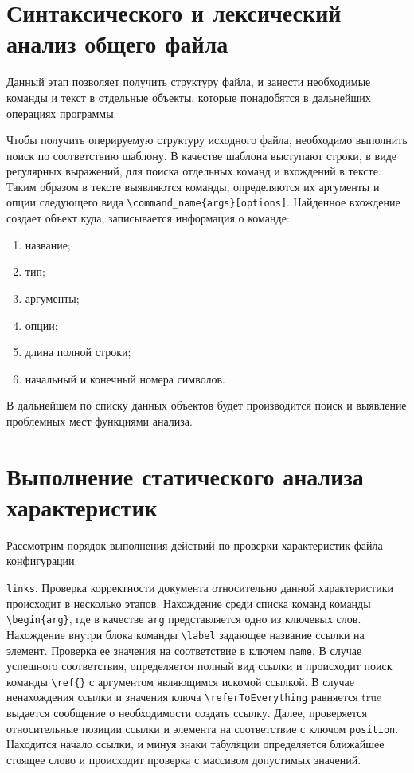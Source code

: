 \section{Синтаксического и лексический анализ общего файла}

Данный этап позволяет получить структуру файла, и занести необходимые команды и текст в отдельные объекты, которые понадобятся в дальнейших операциях программы. 

Чтобы получить оперируемую структуру исходного файла, необходимо выполнить поиск по соответствию шаблону. В качестве шаблона выступают строки, в виде регулярных выражений, для поиска отдельных команд и вхождений в тексте. Таким образом в тексте выявляются команды, определяются их аргументы и опции следующего вида \verb|\command_name{args}[options]|. Найденное вхождение создает объект куда, записывается информация о команде:

\begin{enumerate}
    \item название;
    \item тип;
    \item аргументы;
    \item опции;
    \item длина полной строки;
    \item начальный и конечный номера символов.
\end{enumerate}

В дальнейшем по списку данных объектов будет производится поиск и выявление проблемных мест функциями анализа.

\section{Выполнение статического анализа характеристик}
    Рассмотрим порядок выполнения действий по проверки характеристик файла конфигурации.
    
    \verb|links|. Проверка корректности документа относительно данной характеристики происходит в несколько этапов. Нахождение среди списка команд команды \verb|\begin{arg}|, где в качестве \verb|arg| представляется одно из ключевых слов. Нахождение внутри блока команды \verb|\label| задающее название ссылки на элемент. Проверка ее значения на соответствие в ключем \verb|name|. В случае успешного соответствия, определяется полный вид ссылки и происходит поиск команды \verb|\ref{}| с аргументом являющимся искомой ссылкой. В случае ненахождения ссылки и значения ключа \verb|\referToEverything| равняется true выдается сообщение о необходимости создать ссылку. Далее, проверяется относительные позиции ссылки и элемента на соответствие с ключом \verb|position|. Находится начало ссылки, и минуя знаки табуляции определяется ближайшее стоящее слово и происходит проверка с массивом допустимых значений. 

